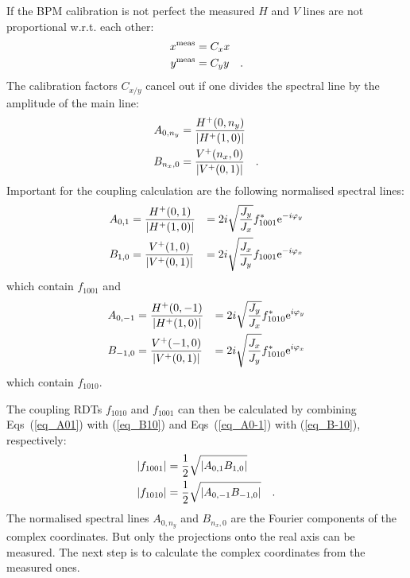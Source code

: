 %
If the BPM calibration is not perfect the measured $H$ and $V$ lines are not proportional w.r.t. each other:
\newcommand{\meas}{^\text{meas}}
%
\begin{align}
   x\meas &= C_x x \notag \\ 
   y\meas &= C_y y
   \fstop
\end{align}
%
The calibration factors $C_{x/y}$ cancel out if one divides the spectral line by the amplitude of
the main line:
%
\begin{align}
    A_{0,n_y} &= \frac{H^+(0,n_y)}{\left|H^+(1,0)\right|} \notag \\
    B_{n_x,0} &= \frac{V^+(n_x,0)}{\left|V^+(0,1)\right|} 
    \quad .
\end{align}
%
Important for the coupling calculation are the following normalised spectral lines:
%
\begin{align}
    A_{0,1}&=\frac{H^+(0,1)}{\left|H^+(1,0)\right|}
      &= 2i\sqrt{\frac{J_y}{J_x}}f_{1001}^* \text{e}^{-i\varphi_{y}}
    \label{eq_A01} \\
    B_{1,0}&=\frac{V^+(1,0)}{\left|V^+(0,1)\right|}
      &= 2i\sqrt{\frac{J_x}{J_y}}{f_{1001}} \text{e}^{-i\varphi_{x}}
    \label{eq_B10}
\end{align}
which contain $f_{1001}$ and
\begin{align}
    A_{0,-1}&=\frac{H^+(0,-1)}{\left|H^+(1,0)\right|}
      &= 2i\sqrt{\frac{J_y}{J_x}}f_{1010}^* \text{e}^{i\varphi_{y}}
    \label{eq_A0-1} \\
    B_{-1,0}&=\frac{V^+(-1,0)}{\left|V^+(0,1)\right|}
      &= 2i\sqrt{\frac{J_x}{J_y}}f_{1010}^* \text{e}^{i\varphi_{x}}
    \label{eq_B-10}
\end{align}
%
which contain $f_{1010}$.

The coupling RDTs $f_{1010}$ and $f_{1001}$ can then be calculated by combining Eqs~(\ref{eq_A01}) with (\ref{eq_B10})
and Eqs~(\ref{eq_A0-1}) with (\ref{eq_B-10}), respectively:
%
\begin{align}
    \left|f_{1001}\right| &= \frac{1}{2}\sqrt{\left| A_{0,1}B_{1,0} \right|} \notag \\
    \left|f_{1010}\right| &= \frac{1}{2}\sqrt{\left| A_{0,-1}B_{-1,0} \right|}
    \label{eq_abs_f_from_AB}
    \quad .
\end{align}
%
The normalised spectral lines $A_{0,n_y}$ and $B_{n_x,0}$ are the Fourier components of the complex
coordinates. But only the projections onto the real axis can be measured. The next step is to calculate
the complex coordinates from the measured ones.

